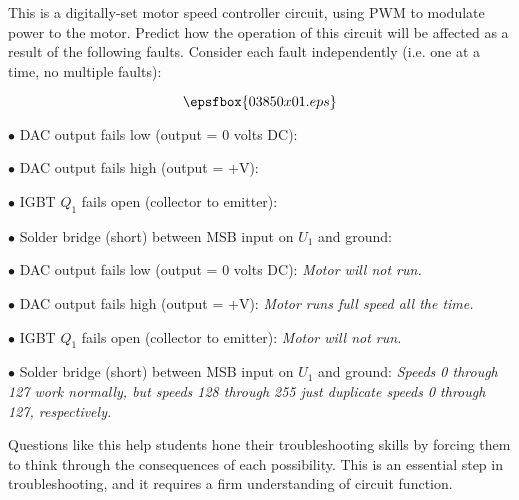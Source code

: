 

This is a digitally-set motor speed controller circuit, using PWM to modulate power to the motor.  Predict how the operation of this circuit will be affected as a result of the following faults.  Consider each fault independently (i.e. one at a time, no multiple faults):

$$\epsfbox{03850x01.eps}$$

\medskip
\item{$\bullet$} DAC output fails low (output = 0 volts DC):
\item{$\bullet$} DAC output fails high (output = +V):
\item{$\bullet$} IGBT $Q_1$ fails open (collector to emitter):
\item{$\bullet$} Solder bridge (short) between MSB input on $U_1$ and ground:
\medskip







\medskip
\item{$\bullet$} DAC output fails low (output = 0 volts DC): {\it Motor will not run.}
\item{$\bullet$} DAC output fails high (output = +V): {\it Motor runs full speed all the time.}
\item{$\bullet$} IGBT $Q_1$ fails open (collector to emitter): {\it Motor will not run.}
\item{$\bullet$} Solder bridge (short) between MSB input on $U_1$ and ground: {\it Speeds 0 through 127 work normally, but speeds 128 through 255 just duplicate speeds 0 through 127, respectively.}
\medskip







Questions like this help students hone their troubleshooting skills by forcing them to think through the consequences of each possibility.  This is an essential step in troubleshooting, and it requires a firm understanding of circuit function.




